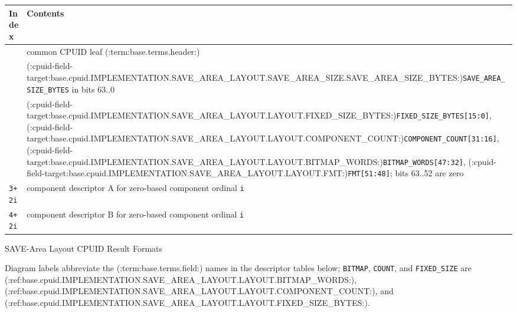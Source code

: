 \Needspace{1.25in}
\begingroup\footnotesize
\setlength{\aboverulesep}{0pt}
\setlength{\belowrulesep}{0pt}
\setlength{\extrarowheight}{1.2pt}
\begin{center}
\begin{tabularx}{\linewidth}{@{}>{\raggedright\arraybackslash}p{0.80in}>{\raggedright\arraybackslash}X@{}}
\toprule
\rowcolor{BedrockHeaderFill}
\textbf{Index} & \textbf{Contents}\\
\midrule
0 & common CPUID leaf (:term:base.terms.header:)\\
1 & (:cpuid-field-target:base.cpuid.IMPLEMENTATION.SAVE_AREA_LAYOUT.SAVE_AREA_SIZE.SAVE_AREA_SIZE_BYTES:)\texttt{SAVE\_AREA\_SIZE\_BYTES} in bits 63..0\\
2 & (:cpuid-field-target:base.cpuid.IMPLEMENTATION.SAVE_AREA_LAYOUT.LAYOUT.FIXED_SIZE_BYTES:)\texttt{FIXED\_SIZE\_BYTES[15:0]}, (:cpuid-field-target:base.cpuid.IMPLEMENTATION.SAVE_AREA_LAYOUT.LAYOUT.COMPONENT_COUNT:)\texttt{COMPONENT\_COUNT[31:16]}, (:cpuid-field-target:base.cpuid.IMPLEMENTATION.SAVE_AREA_LAYOUT.LAYOUT.BITMAP_WORDS:)\texttt{BITMAP\_WORDS[47:32]}, (:cpuid-field-target:base.cpuid.IMPLEMENTATION.SAVE_AREA_LAYOUT.LAYOUT.FMT:)\texttt{FMT[51:48]}; bits 63..52 are zero\\
\texttt{3+2i} & component descriptor A for zero-based component ordinal \texttt{i}\\
\texttt{4+2i} & component descriptor B for zero-based component ordinal \texttt{i}\\
\bottomrule
\end{tabularx}
\end{center}
\endgroup

\begin{BedrockListedFormatDiagram}{SAVE-Area Layout CPUID Result Formats}
\end{BedrockListedFormatDiagram}
{\small Diagram labels abbreviate the (:term:base.terms.field:) names in the descriptor tables below; \texttt{BITMAP}, \texttt{COUNT}, and \texttt{FIXED\_SIZE} are (:ref:base.cpuid.IMPLEMENTATION.SAVE_AREA_LAYOUT.LAYOUT.BITMAP_WORDS:), (:ref:base.cpuid.IMPLEMENTATION.SAVE_AREA_LAYOUT.LAYOUT.COMPONENT_COUNT:), and (:ref:base.cpuid.IMPLEMENTATION.SAVE_AREA_LAYOUT.LAYOUT.FIXED_SIZE_BYTES:).\par}

